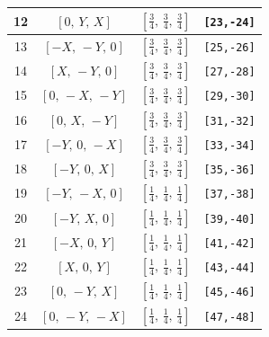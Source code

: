 \documentclass[fleqn,8pt]{jsarticle}
\begin{document}
\begin{longtable}{cccc}
12 & $\left[ 0,\, Y,\, X \right]$ & $\left[ \frac{3}{4},\, \frac{3}{4},\, \frac{3}{4} \right]$ & {\tt [23,-24]} \\ \hline
13 & $\left[ - X,\, - Y,\, 0 \right]$ & $\left[ \frac{3}{4},\, \frac{3}{4},\, \frac{3}{4} \right]$ & {\tt [25,-26]} \\ \hline
14 & $\left[ X,\, - Y,\, 0 \right]$ & $\left[ \frac{3}{4},\, \frac{3}{4},\, \frac{3}{4} \right]$ & {\tt [27,-28]} \\ \hline
15 & $\left[ 0,\, - X,\, - Y \right]$ & $\left[ \frac{3}{4},\, \frac{3}{4},\, \frac{3}{4} \right]$ & {\tt [29,-30]} \\ \hline
16 & $\left[ 0,\, X,\, - Y \right]$ & $\left[ \frac{3}{4},\, \frac{3}{4},\, \frac{3}{4} \right]$ & {\tt [31,-32]} \\ \hline
17 & $\left[ - Y,\, 0,\, - X \right]$ & $\left[ \frac{3}{4},\, \frac{3}{4},\, \frac{3}{4} \right]$ & {\tt [33,-34]} \\ \hline
18 & $\left[ - Y,\, 0,\, X \right]$ & $\left[ \frac{3}{4},\, \frac{3}{4},\, \frac{3}{4} \right]$ & {\tt [35,-36]} \\ \hline
19 & $\left[ - Y,\, - X,\, 0 \right]$ & $\left[ \frac{1}{4},\, \frac{1}{4},\, \frac{1}{4} \right]$ & {\tt [37,-38]} \\ \hline
20 & $\left[ - Y,\, X,\, 0 \right]$ & $\left[ \frac{1}{4},\, \frac{1}{4},\, \frac{1}{4} \right]$ & {\tt [39,-40]} \\ \hline
21 & $\left[ - X,\, 0,\, Y \right]$ & $\left[ \frac{1}{4},\, \frac{1}{4},\, \frac{1}{4} \right]$ & {\tt [41,-42]} \\ \hline
22 & $\left[ X,\, 0,\, Y \right]$ & $\left[ \frac{1}{4},\, \frac{1}{4},\, \frac{1}{4} \right]$ & {\tt [43,-44]} \\ \hline
23 & $\left[ 0,\, - Y,\, X \right]$ & $\left[ \frac{1}{4},\, \frac{1}{4},\, \frac{1}{4} \right]$ & {\tt [45,-46]} \\ \hline
24 & $\left[ 0,\, - Y,\, - X \right]$ & $\left[ \frac{1}{4},\, \frac{1}{4},\, \frac{1}{4} \right]$ & {\tt [47,-48]} \\
\end{longtable}
\renewcommand{\arraystretch}{1.2}
\end{document}
